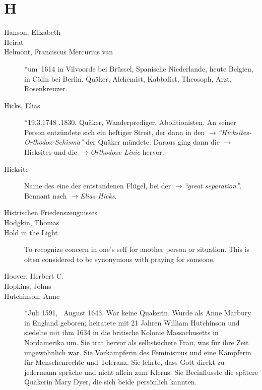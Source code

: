 \section*{H}

\articlesize

\begin{description}

 \item[Hanson, Elizabeth]

 \item[Heirat]

 \item[Helmont, Franciscus Mercurius van] $\ast$um~1614 in Vilvoorde bei Brüssel, Spanische Niederlande, heute Belgien,  in Cölln bei Berlin. Quäker, Alchemist, Kabbalist, Theosoph, Arzt, Rosenkreuzer.

 \item[Hicks, Elias] $\ast$19.3.1748 .1830. Quäker, Wanderprediger, Abolitionisten. An seiner Person entzündete sich ein heftiger Streit, der dann in den  $\to$\textit{"`Hicksites-Orthodox-Schisma"'} der Quäker mündete. Daraus ging dann die $\to$Hicksites und die $\to$\textit{Orthodoxe Linie} hervor.

 \item[Hicksite] Name des eine der entstandenen Flügel, bei der $\to$\textit{"`great separation"'}. Bennant nach $\to$\textit{Elias Hicks}.

 \item[Histrischen Friedenszeugnisses]
 
 \item[Hodgkin, Thomas]

\item[Hold in the Light]
    To recognize concern in one's self for another person or situation. This is often considered to be synonymous with praying for someone.

 \item[Hoover, Herbert C.]

 \item[Hopkins, Johns]

 \item[Hutchinson, Anne] $\ast$Juli 1591, \dag~August 1643. War keine Quakerin. Wurde als Anne Marbury in England geboren; heiratete mit 21 Jahren William Hutchinson und siedelte mit ihm 1634 in die britische Kolonie Massachusetts in Nordamerika um. Sie trat hervor als selbstsichere Frau, was für ihre Zeit ungewöhnlich war. Sie Vorkämpferin des Feminismus und eine Kämpferin für Menschenrechte und Toleranz. Sie lehrte, dass Gott direkt zu jedermann spräche und nicht allein zum Klerus. Sie Beeinflusste die spätere Quäkerin Mary Dyer, die sich beide persönlich kannten.


 \end{description}

\normalsize
